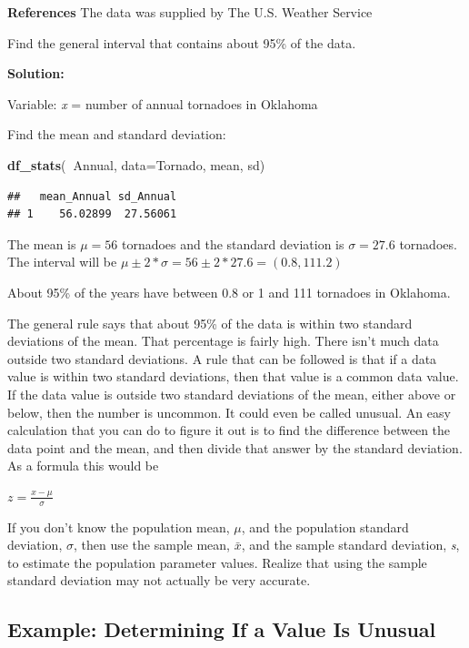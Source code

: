 \documentclass[
]{book}
\newenvironment{Shaded}{\begin{snugshade}}{\end{snugshade}}
\newcommand{\DataTypeTok}[1]{\textcolor[rgb]{0.13,0.29,0.53}{#1}}
\newcommand{\KeywordTok}[1]{\textcolor[rgb]{0.13,0.29,0.53}{\textbf{#1}}}
\newcommand{\NormalTok}[1]{#1}
\newcommand{\OperatorTok}[1]{\textcolor[rgb]{0.81,0.36,0.00}{\textbf{#1}}}
\begin{document}
\textbf{References}
The data was supplied by The U.S. Weather Service

Find the general interval that contains about 95\% of the data.

\textbf{Solution:}

Variable: \emph{x} = number of annual tornadoes in Oklahoma

Find the mean and standard deviation:

\begin{Shaded}
\begin{Highlighting}[]
\KeywordTok{df_stats}\NormalTok{(}\OperatorTok{~}\NormalTok{Annual, }\DataTypeTok{data=}\NormalTok{Tornado, mean, sd)}
\end{Highlighting}
\end{Shaded}

\begin{verbatim}
##   mean_Annual sd_Annual
## 1    56.02899  27.56061
\end{verbatim}

The mean is \(\mu=56\) tornadoes and the standard deviation is \(\sigma=27.6\) tornadoes. The interval will be \(\mu\pm2*\sigma=56\pm2*27.6=(0.8,111.2)\)

About 95\% of the years have between 0.8 or 1 and 111 tornadoes in Oklahoma.

The general rule says that about 95\% of the data is within two standard deviations of the mean. That percentage is fairly high. There isn't much data outside two standard deviations. A rule that can be
followed is that if a data value is within two standard deviations, then that value is a common data value. If the data value is outside two standard deviations of the mean, either above or below, then the number is uncommon. It could even be called unusual. An easy calculation that you can do to figure it out is to find the difference between the data point and the mean, and then divide that answer by the standard
deviation. As a formula this would be

\(z=\frac{x-\mu}{\sigma}\)

If you don't know the population mean, \(\mu\), and the population standard deviation, \(\sigma\), then use the sample mean, \(\bar{x}\), and the sample standard deviation, \emph{s}, to estimate the population parameter values. Realize that using the sample standard deviation may not actually be very accurate.

\hypertarget{example-determining-if-a-value-is-unusual}{%
\subsection{Example: Determining If a Value Is Unusual}\label{example-determining-if-a-value-is-unusual}}
\end{document}
